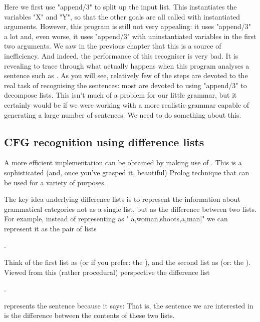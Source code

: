 Here we first use "append/3" to split up the input list. This
instantiates the variables "X" and "Y", so that the other goals are
all called with instantiated arguments. However, this program is still
not very appealing: it uses "append/3" a lot and, even worse, it uses
"append/3" with uninstantiated variables in the first two
arguments. We saw in the previous chapter that this is a source of
inefficiency. And indeed, the performance of this recogniser is very
bad.  It is revealing to trace through what actually happens when this
program analyses a sentence such as .
As you will see, relatively few of the steps are devoted to the real
task of recognising the sentences: most are devoted to using
"append/3" to decompose lists.  This isn't much of a problem for our
little grammar, but it certainly would be if we were working with a
more realistic grammar capable of generating a large number of
sentences. We need to do something about this.

\subsection*{CFG recognition using difference lists}\label{SUBSEC.L7.DIFF.STRUCTURES}



A more efficient implementation can be obtained by making use of
. This is a sophisticated (and, once you've
grasped it, beautiful) Prolog technique that can be used for a
variety of purposes.


The key idea underlying difference lists is to represent the
information about grammatical categories not as a single list, but as
the difference between two lists.  For example, instead of
representing  as
"[a,woman,shoots,a,man]" we can represent it as the pair of lists
\begin{LPNcodedisplay}
.
\end{LPNcodedisplay}
 Think of the first list as
 (or if you prefer:  the ), and the second list as  (or:
the ).  Viewed from this (rather procedural) perspective
the difference list
\begin{LPNcodedisplay}
.
\end{LPNcodedisplay}
 represents the sentence  because it says:
That is, the sentence we are interested in is the difference
between the contents of these two lists.



